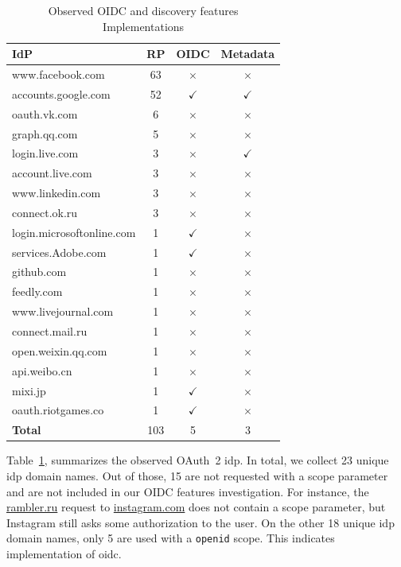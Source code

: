 \begin{table}
\centering
\begin{tabular}{@{}lccc@{}}
  \toprule\toprule
  \textbf{IdP} & \textbf{RP} & \textbf{OIDC} & \textbf{Metadata}\\
  \midrule
  www.facebook.com     & 63 & $\times$ & $\times$ \\
  accounts.google.com      & 52  & $\checkmark$ & $\checkmark$ \\
  oauth.vk.com          &6 & $\times$ &  $\times$ \\
  graph.qq.com          &5 & $\times$ &  $\times$ \\
  login.live.com          & 3 & $\times$ & $\checkmark$ \\
  account.live.com          &3 & $\times$ & $\times$ \\
  www.linkedin.com          &3 & $\times$  & $\times$ \\
  connect.ok.ru          &3 & $\times$ &  $\times$ \\
  login.microsoftonline.com &1 & $\checkmark$ & $\times$ \\
  services.Adobe.com     &1 & $\checkmark$ & $\times$ \\
  github.com              &1 & $\times$  & $\times$ \\
  feedly.com             &1 & $\times$ &  $\times$ \\
  www.livejournal.com      &1 & $\times$ &  $\times$ \\
  connect.mail.ru          &1 & $\times$ &  $\times$ \\
  open.weixin.qq.com      &1 & $\times$ & $\times$ \\
  api.weibo.cn            &1 & $\times$ & $\times$ \\
  mixi.jp                  &1 & $\checkmark$ & $\times$ \\
  oauth.riotgames.co         &1 & $\checkmark$ & $\times$ \\
  \midrule
  \textbf{Total}                & 103 & 5 & 3 \\
  \bottomrule
\end{tabular}

\caption{Observed OIDC and discovery features Implementations}
\label{tab_discoveryimplem}
\end{table}

Table~\ref{tab_discoveryimplem}, summarizes the observed OAuth~2 \gls{idp}.
In total, we collect 23 unique \gls{idp} domain names.
Out of those, 15 are not requested with a scope parameter and are not included in our OIDC features investigation.
For instance, the \url{rambler.ru} request to \url{instagram.com} does not contain a scope parameter, but Instagram still asks some authorization to the user.
On the other 18 unique \gls{idp} domain names, only 5 are used with a \texttt{openid} scope.
This indicates implementation of \gls{oidc}.

